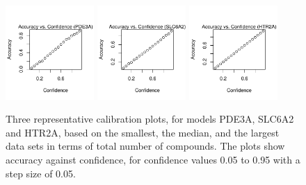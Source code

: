 \documentclass[10pt,article]{memoir}
\begin{document}
\begin{figure}[h!]
\includegraphics[width=0.3\textwidth]{figures/calibration_plots/pde3a_calib.pdf}
\includegraphics[width=0.3\textwidth]{figures/calibration_plots/slc6a2_calib.pdf}
\includegraphics[width=0.3\textwidth]{figures/calibration_plots/htr2a_calib.pdf}
    \caption{Three representative calibration plots, for models PDE3A, SLC6A2
    and HTR2A, based on the smallest, the median, and the largest data sets in
    terms of total number of compounds. The plots show accuracy against
    confidence, for confidence values 0.05 to 0.95 with a step size of 0.05.}
    \label{fig:calibration_plots}
\end{figure}
\end{document}
